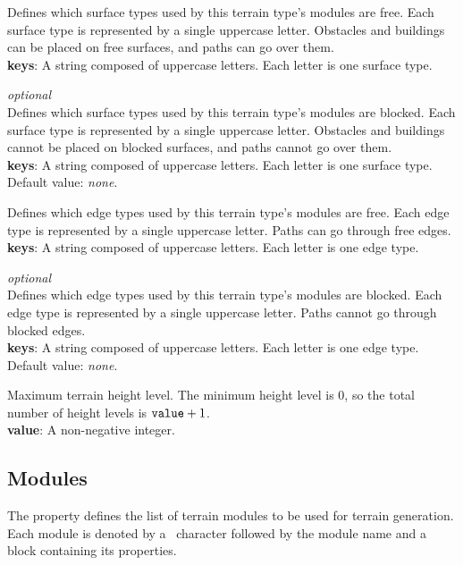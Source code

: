 Defines which surface types used by this terrain type's modules are free.
Each surface type is represented by a single uppercase letter.
Obstacles and buildings can be placed on free surfaces, and paths can go over them.\\
\textbf{keys}: A string composed of uppercase letters. Each letter is one surface type.

\emph{optional}\\
Defines which surface types used by this terrain type's modules are blocked.
Each surface type is represented by a single uppercase letter.
Obstacles and buildings cannot be placed on blocked surfaces, and paths cannot go over them.\\
\textbf{keys}: A string composed of uppercase letters. Each letter is one surface type.\\
Default value: \emph{none}.

Defines which edge types used by this terrain type's modules are free.
Each edge type is represented by a single uppercase letter.
Paths can go through free edges.\\
\textbf{keys}: A string composed of uppercase letters. Each letter is one edge type.

\emph{optional}\\
Defines which edge types used by this terrain type's modules are blocked.
Each edge type is represented by a single uppercase letter.
Paths cannot go through blocked edges.\\
\textbf{keys}: A string composed of uppercase letters. Each letter is one edge type.\\
Default value: \emph{none}.

Maximum terrain height level.
The minimum height level is 0, so the total number of height levels is $\texttt{value} + 1$.\\
\textbf{value}: A non-negative integer.

\subsection{Modules}

The  property defines the list of terrain modules to be used for terrain generation.
Each module is denoted by a \mono{*}~character followed by the module name and a block containing its properties.

